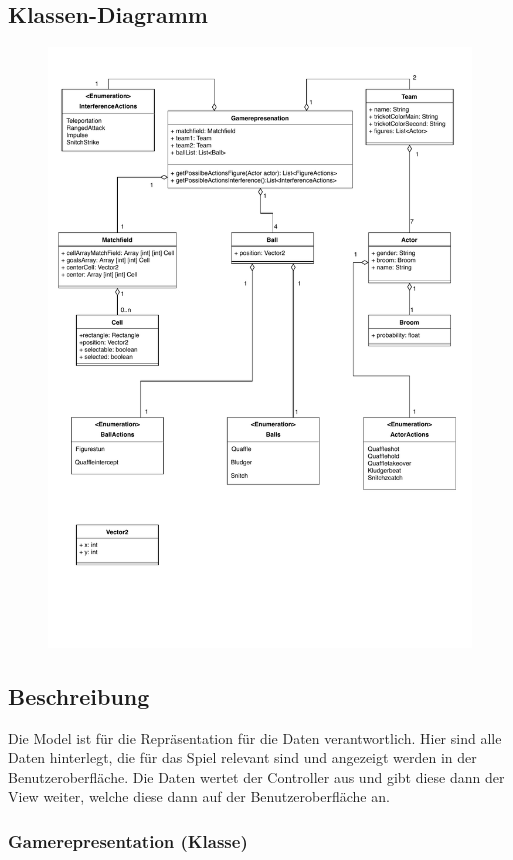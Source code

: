\subsection{Klassen-Diagramm}
	\begin{figure}[H]
        \centering
        \includegraphics[scale=0.7]{images/model.pdf}
    \end{figure}

\subsection{Beschreibung}
Die Model ist für die Repräsentation für die Daten verantwortlich. Hier sind alle Daten hinterlegt, die für das Spiel relevant sind und angezeigt werden in der Benutzeroberfläche. Die Daten wertet der Controller aus und gibt diese dann der View weiter, welche diese dann auf der Benutzeroberfläche an.
	\subsubsection{Gamerepresentation (Klasse)}
	
